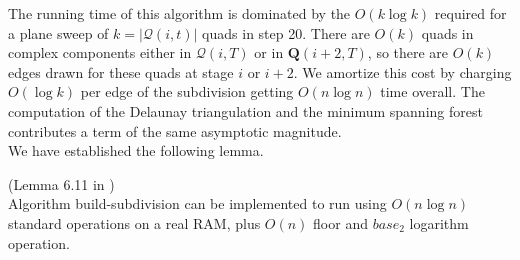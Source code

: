 The running time of this algorithm is dominated by the $O(k \log k)$ required for a plane sweep \cite{CompGeo} of $k=|\mathcal{Q}(i,t)|$ quads in step 20. There are $O(k)$ quads in complex components either in $\mathcal{Q}(i,T)$ or in $\mathbf{Q}(i+2,T)$, so there are $O(k)$ edges drawn for these quads at stage $i$ or $i+2$. We amortize this cost by charging $O(\log k)$ per edge of the subdivision getting $O(n\log n)$ time overall. The computation of the Delaunay triangulation and the minimum spanning forest contributes a term of the same asymptotic magnitude.\\
We have established the following lemma.

\begin{Lemma} (Lemma 6.11 in \cite{HershbergerS99}) \label{lemma:6.11HershbergerS99}\\
Algorithm build-subdivision can be implemented to run using $O(n \log n)$ standard operations on a real RAM, plus $O(n)$ floor and $base_2$ logarithm operation.
\end{Lemma}